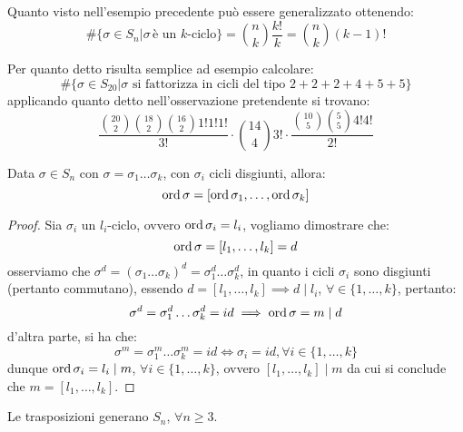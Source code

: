 \documentclass[11pt]{scrartcl}
\begin{document}
\begin{remark}
    Quanto visto nell'esempio precedente può essere generalizzato ottenendo:
        \[ \#\{\sigma \in S_n | \sigma\,\text{è un $k$-ciclo}\} = \binom{n}{k}\frac{k!}{k} = \binom{n}{k}(k-1)!
            \]
\end{remark}

\begin{example}
    Per quanto detto risulta semplice ad esempio calcolare:
        \[ \#\{\sigma \in S_{20} | \text{$\sigma$ si fattorizza in cicli del tipo $2+2+2+4+5+5$}\}
            \]
    applicando quanto detto nell'osservazione pretendente si trovano:
        \[ \frac{\binom{20}{2}\binom{18}{2}\binom{16}{2}1!1!1!}{3!} \cdot \binom{14}{4}3! \cdot \frac{\binom{10}{5}\binom{5}{5}4!4!}{2!}
            \]
\end{example}

\begin{proposition}
    Data $\sigma \in S_n$ con $\sigma = \sigma_1\ldots\sigma_k$, con $\sigma_i$ cicli disgiunti, allora:
        \[ \operatorname{ord} \sigma = [\operatorname{ord} \sigma_1,\ldots, \operatorname{ord}\sigma_k]
            \]
\end{proposition}

\begin{proof}
    Sia $\sigma_i$ un $l_i$-ciclo, ovvero $\operatorname{ord}\sigma_i = l_i$, vogliamo dimostrare che:
        \[ \operatorname{ord}\sigma = [l_1,\ldots,l_k] = d
            \]
    osserviamo che $\sigma^d = (\sigma_1\ldots\sigma_k)^d = \sigma_1^d\ldots\sigma_k^d$, in quanto i cicli $\sigma_i$ sono disgiunti (pertanto commutano),
    essendo $d = [l_1,\ldots,l_k] \implies d \mid l_i$, $\forall \in \{1,\ldots,k\}$, pertanto:
        \[ \sigma^d = \sigma_1^d\ldots\sigma_k^d = id \implies \operatorname{ord} \sigma = m \mid d
            \]
    d'altra parte, si ha che:
        \[ \sigma^m = \sigma_1^m\ldots\sigma_k^m = id \iff \sigma_i = id, \forall i \in\{1,\ldots,k\}
            \]
    dunque $\operatorname{ord} \sigma_i = l_i \mid m$, $\forall i \in\{1,\ldots,k\}$, ovvero $[l_1,\ldots,l_k] \mid m$ da cui si conclude che $m = [l_1,\ldots,l_k]$.
\end{proof}

\begin{proposition}
    \label{trasp}
    Le trasposizioni generano $S_n$, $\forall n \geq 3$.
\end{proposition}
\end{document}
